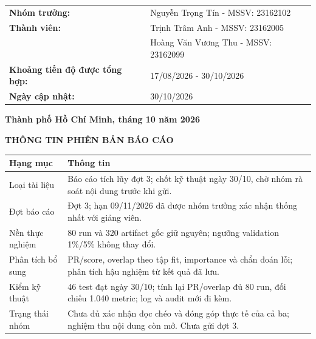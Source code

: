 \documentclass[12pt,a4paper,oneside]{report}
\begin{document}
\begin{titlepage}
\begin{center}
{\begin{tabularx}{0.86\textwidth}{L{6.0cm}Y}
    \textbf{Nhóm trưởng:} & Nguyễn Trọng Tín - MSSV: 23162102 \\
    \textbf{Thành viên:} & Trịnh Trâm Anh - MSSV: 23162005 \\
    & Hoàng Văn Vương Thu - MSSV: 23162099 \\
    \textbf{Khoảng tiến độ được tổng hợp:} & 17/08/2026 - 30/10/2026 \\
    \textbf{Ngày cập nhật:} & 30/10/2026 \\
  \end{tabularx}}
\end{center}
\vfill
\begin{center}{\bfseries Thành phố Hồ Chí Minh, tháng 10 năm 2026}\end{center}
\end{titlepage}

\thispagestyle{empty}
\vspace*{-1.05cm}
\begin{center}{\bfseries\fontsize{16pt}{20pt}\selectfont\color{HCMUTEDark} THÔNG TIN PHIÊN BẢN BÁO CÁO}\end{center}
\vspace{0.25cm}
\begingroup\fontsize{10.5pt}{13pt}\selectfont\renewcommand{\arraystretch}{1.5}
\begin{tabularx}{\textwidth}{L{4.2cm}Y}\toprule
\textbf{Hạng mục} & \textbf{Thông tin}\\\midrule
Loại tài liệu & Báo cáo tích lũy đợt 3; chốt kỹ thuật ngày 30/10, chờ nhóm rà soát nội dung trước khi gửi.\\
Đợt báo cáo & Đợt 3; hạn 09/11/2026 đã được nhóm trưởng xác nhận thống nhất với giảng viên.\\
Nền thực nghiệm & 80 run và 320 artifact gốc giữ nguyên; ngưỡng validation 1\%/5\% không thay đổi.\\
Phân tích bổ sung & PR/score, overlap theo tập fit, importance và chẩn đoán lỗi; phân tích hậu nghiệm từ kết quả đã lưu.\\
Kiểm kỹ thuật & 46 test đạt ngày 30/10; tính lại PR/overlap đủ 80 run, đối chiếu 1.040 metric; log và audit mới đi kèm.\\
Trạng thái nhóm & Chưa đủ xác nhận đọc chéo và đóng góp thực tế của cả ba; nghiệm thu nội dung còn mở. Chưa gửi đợt 3.\\
\bottomrule\end{tabularx}\endgroup
\vspace{0.35cm}
\end{document}
